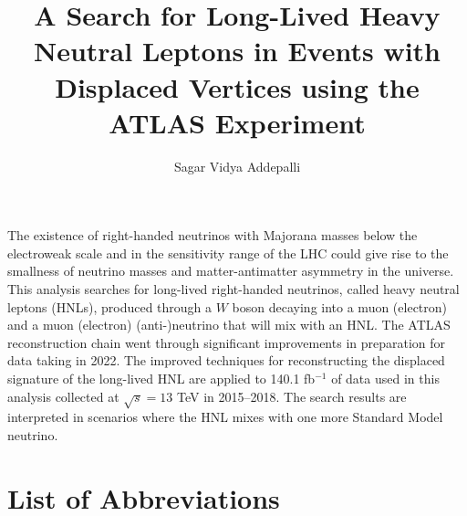 \documentclass{brandeis-dissertation3.14}
\title{A Search for Long-Lived Heavy Neutral Leptons in Events with Displaced Vertices using the ATLAS Experiment}
\author{Sagar Vidya Addepalli}
\begin{document}
\maketitlepage
\makeapproval
\setlength{\cftchapnumwidth}{3em}
\setlength{\cfttabnumwidth}{3em}
\setlength{\cftfignumwidth}{3em}

\begin{dissertation-acknowledgements}

\end{dissertation-acknowledgements}

\begin{dissertation-abstract}
The existence of right-handed neutrinos with Majorana masses below the electroweak scale and in the sensitivity range of the LHC could give rise to the smallness of neutrino masses and matter-antimatter asymmetry in the universe. This analysis searches for long-lived right-handed neutrinos, called heavy neutral leptons (HNLs), produced through a $W$ boson decaying into a muon (electron) and a muon (electron) (anti-)neutrino that will mix with an HNL. The ATLAS reconstruction chain went through significant improvements in preparation for data taking in 2022. The improved techniques for reconstructing the displaced signature of the long-lived HNL are applied to 140.1 fb$^{-1}$ of data used in this analysis collected at $\sqrt{s}=13$ TeV in 2015--2018. The search results are interpreted in scenarios where the HNL mixes with one more Standard Model neutrino.
\end{dissertation-abstract}

\doublespacing
\pagestyle{fancy}
\fancyhead{}
\renewcommand{\headrulewidth}{0pt}


\tableofcontents
\clearpage

\listoftables
\pagebreak
\listoffigures
\pagebreak
\setcounter{secnumdepth}{0}
\chapter*{List of Abbreviations}

\setcounter{secnumdepth}{2}

\startbody

\end{document}
